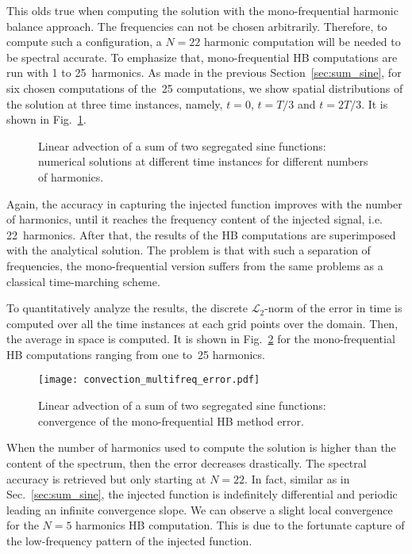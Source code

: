 This olds true when computing the solution with the mono-frequential
harmonic balance approach. The frequencies can not be chosen arbitrarily.
Therefore, to compute such a configuration, a $N=22$ harmonic computation
will be needed to be spectral accurate. To emphasize that, mono-frequential
HB computations are run with 1 to 25~harmonics.
As made in the previous Section~\ref{sec:sum_sine}, 
for six chosen computations of the~25 computations, 
we show spatial distributions of the solution
at three time instances, namely, $t=0$, $t=T/3$ and $t=2T/3$.
It is shown in Fig.~\ref{fig:inj_multifreq_tsm}.
\begin{figure}[htb]
  \centering
  \caption{Linear advection of a sum of two segregated sine functions: 
  numerical solutions at different time instances for different numbers of harmonics.}
  \label{fig:inj_multifreq_tsm}
\end{figure}
Again, the accuracy in capturing the injected function
improves with the number of harmonics,
until it reaches the frequency content
of the injected signal, i.e. 22~harmonics.
After that, the results of the HB computations are
superimposed with the analytical solution. 
The problem is that with such a separation of frequencies,
the mono-frequential version suffers from the same
problems as a classical time-marching scheme.

To quantitatively analyze the results,
the discrete $\mathcal{L}_2$-norm of the error 
in time is computed over all the time instances
at each grid points over the domain.
Then, the average in space is computed.
It is shown in Fig.~\ref{fig:conv_multifreq_tsm} for the
mono-frequential HB computations ranging from one to~25
harmonics.
\begin{figure}[htb]
  \centering
  \texttt{[image: convection\_multifreq\_error.pdf]}
  \caption{Linear advection of a sum of two segregated sine functions: convergence of the mono-frequential HB method error.}
  \label{fig:conv_multifreq_tsm}
\end{figure}
When the number of harmonics
used to compute the solution is higher than the content of the spectrum,
then the error decreases drastically. The spectral accuracy is retrieved
but only starting at $N=22$.
In fact, similar as in Sec.~\ref{sec:sum_sine},
the injected function is indefinitely differential and periodic
leading an infinite convergence slope. We can observe a slight local convergence
for the $N=5$ harmonics HB computation. This is due to the fortunate 
capture of the low-frequency pattern of the injected function.

